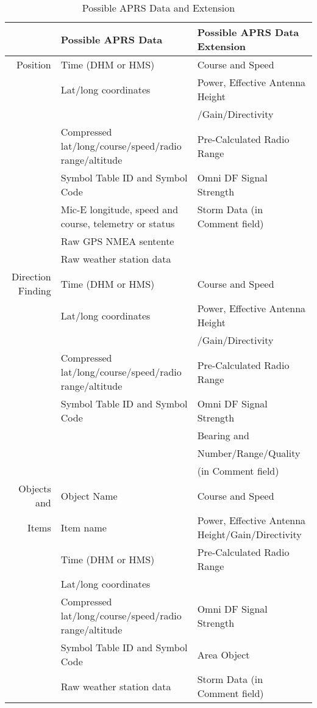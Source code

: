 \begin{table}[htbp]
  \caption{Possible APRS Data and Extension}
  \begin{tabular}{|r|l|l|}
    \hline
    & Possible APRS Data & Possible APRS Data Extension \\
    \hline

    
    Position & Time (DHM or HMS) & Course and Speed \\
    & Lat/long coordinates & Power, Effective Antenna Height \\
    & & /Gain/Directivity \\
    & Compressed lat/long/course/speed/radio range/altitude & Pre-Calculated Radio Range \\
    & Symbol Table ID and Symbol Code & Omni DF Signal Strength \\
    & Mic-E longitude, speed and course, telemetry or status & Storm Data (in Comment field) \\
    & Raw GPS NMEA sentente & \\
    & Raw weather station data & \\
    \hline
    

    Direction Finding & Time (DHM or HMS) & Course and Speed \\
    & Lat/long coordinates & Power, Effective Antenna Height \\
    & & /Gain/Directivity \\
    & Compressed lat/long/course/speed/radio range/altitude & Pre-Calculated Radio Range \\
    & Symbol Table ID and Symbol Code & Omni DF Signal Strength \\
    & & Bearing and \\
    & & Number/Range/Quality \\
    & & (in Comment field) \\
    \hline

    Objects and & Object Name & Course and Speed \\
    Items & Item name & Power, Effective Antenna Height/Gain/Directivity \\
    & Time  (DHM or HMS) & Pre-Calculated Radio Range \\
    & Lat/long coordinates & \\
    & Compressed lat/long/course/speed/radio range/altitude & Omni DF Signal Strength \\
    & Symbol Table ID and Symbol Code & Area Object \\
    & Raw weather station data & Storm Data (in Comment field) \\
    \hline
    

\end{tabular}
\end{table}
